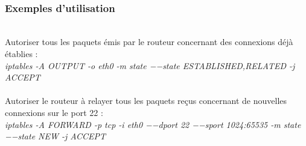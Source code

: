 \documentclass[journal, a4paper]{IEEEtran}
\begin{document}
~\\
\subsubsection{Exemples d'utilisation}
~\\
Autoriser tous les paquets émis par le routeur concernant des connexions déjà établies :\\
\textit{iptables -A OUTPUT -o eth0 -m state −−state ESTABLISHED,RELATED -j ACCEPT}\\
~\\
Autoriser le routeur à relayer tous les paquets reçus concernant de nouvelles connexions sur le port 22 :\\
\textit{iptables -A FORWARD -p tcp -i eth0 −−dport 22 −−sport 1024:65535 -m state −−state NEW -j ACCEPT}\\

\newpage
\end{document}

